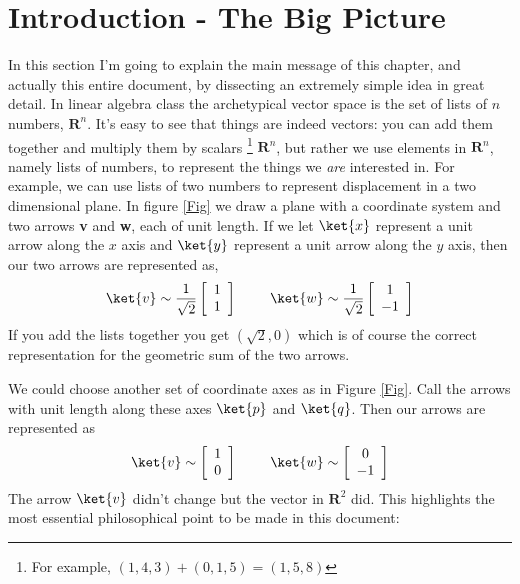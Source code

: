 \section{Introduction - The Big Picture}
In this section I'm going to explain the main message of this chapter, and actually this entire document, by dissecting an extremely simple idea in great detail.
In linear algebra class the archetypical vector space is the set of lists of $n$ numbers, $\textbf{R}^n$.
It's easy to see that things are indeed vectors: you can add them together and multiply them by scalars \footnote{For example, $(1,4,3)+(0,1,5)=(1,5,8)$}  $\textbf{R}^n$, but rather we use elements in $\textbf{R}^n$, namely lists of numbers, to represent the things we \emph{are} interested in.
For example, we can use lists of two numbers to represent displacement in a two dimensional plane.
In figure \ref{Fig} we draw a plane with a coordinate system and two arrows \textbf{v} and \textbf{w}, each of unit length.
If we let $\ket{x}$ represent a unit arrow along the $x$ axis and $\ket{y}$ represent a unit arrow along the $y$ axis, then our two arrows are represented as,
\begin{equation}
\ket{v} \sim \frac{1}{\sqrt{2}} \left[ \begin{array}{c} 1 \\ 1 \end{array} \right] \
\qquad \ket{w} \sim \frac{1}{\sqrt{2}} \left[ \begin{array}{c} 1 \\ -1 \end{array} \right]
\end{equation}
If you add the lists together you get $(\sqrt{2},0)$ which is of course the correct representation for the geometric sum of the two arrows.

We could choose another set of coordinate axes as in Figure \ref{Fig}.
Call the arrows with unit length along these axes $\ket{p}$ and $\ket{q}$.
Then our arrows are represented as
\begin{displaymath}
\ket{v}\sim \left[\begin{array}{c} 1 \\ 0 \end{array} \right] \qquad \
\ket{w}\sim \left[\begin{array}{c} 0 \\ -1 \end{array} \right]
\end{displaymath}
The arrow $\ket{v}$ didn't change but the vector in $\textbf{R}^2$ did.
This highlights the most essential philosophical point to be made in this document: 
